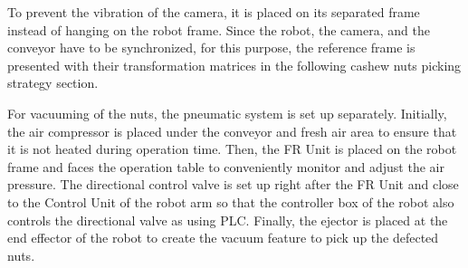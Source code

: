 \documentclass[10pt, letterpaper]{article}
\begin{document}
    To prevent the vibration of the camera, it is placed on its separated frame instead of hanging on the robot frame. Since the robot, the camera, and the conveyor have to be synchronized, for this purpose, the reference frame is presented with their transformation matrices in the following cashew nuts picking strategy section. \par
    For vacuuming of the nuts, the pneumatic system is set up separately. Initially, the air compressor is placed under the conveyor and fresh air area to ensure that it is not heated during operation time. Then, the FR Unit is placed on the robot frame and faces the operation table to conveniently monitor and adjust the air pressure. The directional control valve is set up right after the FR Unit and close to the Control Unit of the robot arm so that the controller box of the robot also controls the directional valve as using PLC. Finally, the ejector is placed at the end effector of the robot to create the vacuum feature to pick up the defected nuts. \par
\end{document}

